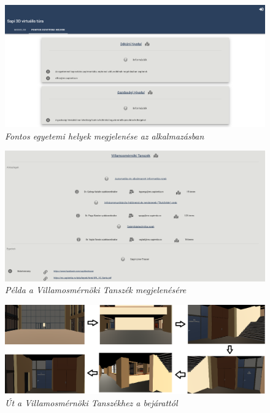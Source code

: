 \begin{figure}[H]
	\centering
	\includegraphics[width=1\linewidth]{figures/images/egyetemiHelyek.png}
	\caption[Fontos egyetemi helyek megjelenése az alkalmazásban]{\textit{Fontos egyetemi helyek megjelenése az alkalmazásban}}
	\label{fig:importantPlace}
\end{figure} 

\begin{figure}[H]
	\centering
	\includegraphics[width=1\linewidth]{figures/images/vmTanMeg.png}
	\caption[Példa a Villamosmérnöki Tanszék megjelenésére]{\textit{Példa a Villamosmérnöki Tanszék megjelenésére}}
	\label{fig:vmTan}
\end{figure} 

\begin{figure}[H]
	\centering
	\includegraphics[width=1\linewidth]{figures/images/utVMT.png}
	\caption[Út a Villamosmérnöki Tanszékhez a bejárattól]{\textit{Út a Villamosmérnöki Tanszékhez a bejárattól}}
	\label{fig:utVmTan}
\end{figure} 

